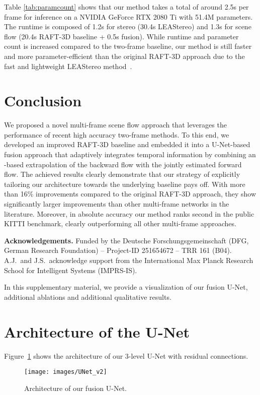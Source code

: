 \documentclass[10pt,twocolumn,letterpaper]{article}
\begin{document}
Table \ref{tab:paramcount} shows that our method takes a total of around 2.5s per frame for inference on a NVIDIA GeForce RTX 2080 Ti with 51.4M parameters.
The runtime is composed of 1.2s for stereo (30.4s LEAStereo) and 1.3s for scene flow (20.4s RAFT-3D baseline + 0.5s fusion).
While runtime and parameter count is increased compared to the two-frame baseline, our method is still faster and more parameter-efficient than the original RAFT-3D approach due to the fast and lightweight LEAStereo method~\cite{Cheng2020_LEAStereo}.





\section{Conclusion}
We proposed a novel multi-frame scene flow approach that leverages the performance of recent high accuracy two-frame methods. To this end, we developed an improved RAFT-3D baseline and embedded it into a U-Net-based fusion approach that adaptively integrates temporal information by combining an -based extrapolation of the backward flow with the jointly estimated forward flow. 
The achieved results clearly demonstrate that our strategy of explicitly tailoring our architecture towards the underlying baseline pays off.
With more than 16\% improvements compared to the original RAFT-3D approach, they show significantly larger improvements than other multi-frame networks in the literature. Moreover, in absolute accuracy  
our method ranks second in the public KITTI benchmark, clearly outperforming all other multi-frame approaches. 



\medskip
\noindent
\textbf{Acknowledgements.}
Funded by the Deutsche Forschungsgemeinschaft (DFG, German Research Foundation) -- Project-ID 251654672 -- TRR 161 (B04).
A.J.\ and J.S.\ acknowledge support from the International Max Planck Research School for Intelligent Systems (IMPRS-IS).


{\small


}

\clearpage
\appendix

In this supplementary material, we provide a visualization of our fusion U-Net, additional ablations and additional qualitative results.

\section{Architecture of the U-Net}
Figure~\ref{fig:UNet} shows the architecture of our 3-level U-Net with residual connections.
\begin{figure}[h!]
    \centering
    \texttt{[image: images/UNet\_v2]}
    \caption{Architecture of our fusion U-Net.}
    \label{fig:UNet}
\end{figure}
\end{document}
